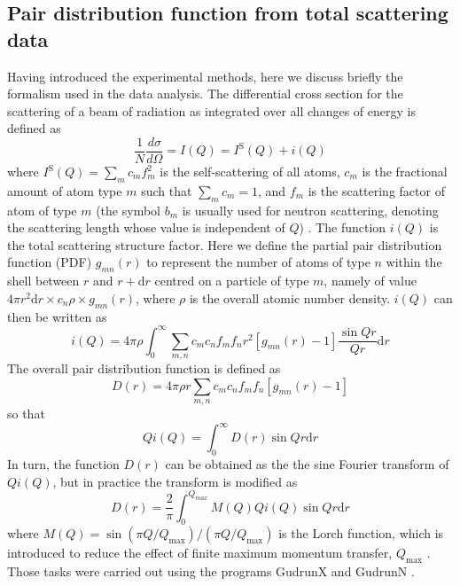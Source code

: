 \documentclass[twoside,twocolumn,9pt]{article}
\begin{document}
\subsection{Pair distribution function from total scattering data}
Having introduced the experimental methods, here we discuss briefly the formalism used in the data analysis.
The differential cross section for the scattering of a beam of radiation as integrated over all changes of energy is defined as
\begin{equation}
\frac{1}{N}\frac{d\sigma}{d\Omega}=I(Q)=I^\mathrm{S}(Q)+i(Q)
\end{equation}
where $I^\mathrm{S}(Q)=  \sum_m c_m f_m^2 $ is the self-scattering of all atoms, $c_m$ is the fractional amount of atom type $m$ such that $\sum_m c_m = 1$, and $f_m$ is the scattering factor of atom of type $m$ (the symbol $b_m$ is usually used for neutron scattering, denoting the scattering length whose value is independent of $Q$) \cite{Keen:2001wc}. The function $i(Q)$ is the total scattering structure factor. Here we define the partial pair distribution function (PDF) $g_{mn}(r)$ to represent the number of atoms of type $n$ within the shell between $r$ and  $r+\mathrm{d}r$ centred on a particle of type $m$, namely of value $4 \pi r^2 \mathrm{d}r \times c_n \rho \times g_{mn}(r)$,  where $\rho$ is the overall atomic number density.
$i(Q)$ can then be written as \cite{Dove2002}
\begin{equation} \label{eq:iQ}
i(Q)=4\pi\rho\int^{\infty}_{0}\sum_{m,n}c_m c_n f_m f_n r^2 [g_{mn}(r)-1]\frac{\sin{Qr}}{Qr} \mathrm{d}r
\end{equation}
 The overall pair distribution function is defined as
\begin{equation}\label{eq:Dr}
D(r)=4\pi\rho r \sum_{m,n}c_m c_n f_m f_n [g_{mn}(r)-1]
\end{equation}
so that
\begin{equation}
Qi(Q)=\int^{\infty}_{0} D(r) \sin{Qr} \mathrm{d}r
\end{equation}
In turn, the function $D(r)$ can be obtained as the the sine Fourier transform of $Qi(Q)$, but in practice the transform is modified as
\begin{equation}\label{eq:Dr2}
D(r)=\frac{2}{\pi}\int^{Q_{max}}_{0} M(Q)Qi(Q)\sin{Qr} \mathrm{d}r
\end{equation}
where $M(Q) = \sin(\pi Q/Q_\mathrm{max})/(\pi Q/Q_\mathrm{max})$ is the Lorch function, which is introduced to reduce the effect of finite maximum momentum transfer, $Q_\mathrm{max}$ \cite{Lorch:1969js, Dove2002, Soper:2012kr}. Those tasks were carried out using the programs GudrunX and GudrunN \cite{Soper:2011fda,Soper:2012vs}.
\end{document}
